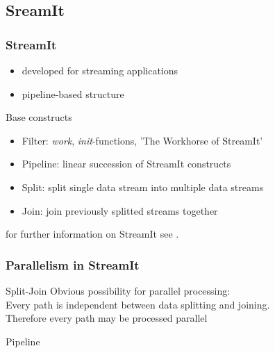 \documentclass{beamer}
\begin{document}
\subsection{SreamIt}
\begin{frame}
\frametitle{StreamIt}
	\begin{itemize}
		\item developed for streaming applications
		\item pipeline-based structure
	\end{itemize}
	\begin{block}{Base constructs}
		\begin{itemize}
			\item Filter: \textit{work}, \textit{init}-functions, 'The Workhorse of StreamIt'
			\item Pipeline: linear succession of StreamIt constructs
			\item Split: split single data stream into multiple data streams
			\item Join: join previously splitted streams together
		\end{itemize}
	\end{block}
	for further information on StreamIt see \cite{streamIt}.
\end{frame}

\begin{frame}
\frametitle{Parallelism in StreamIt}
	\begin{block}{Split-Join}
		Obvious possibility for parallel processing:\\
		Every path is independent between data splitting and joining.\\
		Therefore every path may be processed parallel
	\end{block}
	\begin{block}{Pipeline}

	\end{block}
\end{frame}

\end{document}
